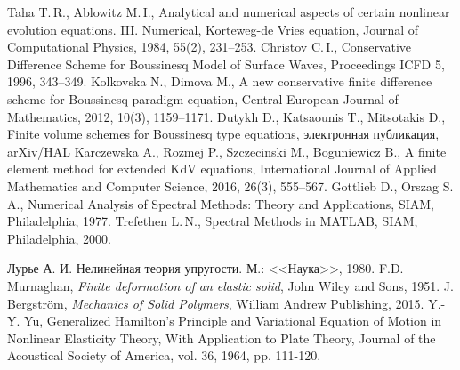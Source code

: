 \documentclass[12pt, a4paper]{report}
\begin{document}
\begin{thebibliography}{99}
	 Taha T.\,R., Ablowitz M.\,I., Analytical and numerical aspects of certain nonlinear evolution equations. III. Numerical, Korteweg-de Vries equation, Journal of Computational Physics, 1984, 55(2), 231--253.
	 Christov C.\,I., Conservative Difference Scheme for Boussinesq Model of Surface Waves, Proceedings ICFD 5, 1996, 343--349.
	 Kolkovska N., Dimova M., A new conservative finite difference scheme for Boussinesq paradigm equation, Central European Journal of Mathematics, 2012, 10(3), 1159--1171.
	 Dutykh D., Katsaounis T., Mitsotakis D., Finite volume schemes for Boussinesq type equations, электронная публикация, arXiv/HAL
	 Karczewska A., Rozmej P., Szczecinski M., Boguniewicz B., A finite element method for extended KdV equations, International Journal of Applied Mathematics and Computer Science, 2016, 26(3), 555--567.
	 Gottlieb D., Orszag S.\,A., Numerical Analysis of Spectral Methods: Theory and Applications, SIAM, Philadelphia, 1977.
	 Trefethen L.\,N., Spectral Methods in MATLAB, SIAM, Philadelphia, 2000.
	
	 Лурье А. И. Нелинейная теория упругости. М.: <<Наука>>, 1980.
	 F.D. Murnaghan, \textit{Finite deformation of an elastic solid}, John Wiley and Sons, 1951.
	 J. Bergstr\"{o}m, \textit{Mechanics of Solid Polymers}, William Andrew Publishing, 2015.
	 Y.-Y. Yu, Generalized Hamilton's Principle and Variational Equation of Motion in Nonlinear Elasticity Theory, With Application to Plate Theory, Journal of the Acoustical Society of America, vol. 36, 1964, pp. 111-120.
	

\end{thebibliography}
\end{document}
